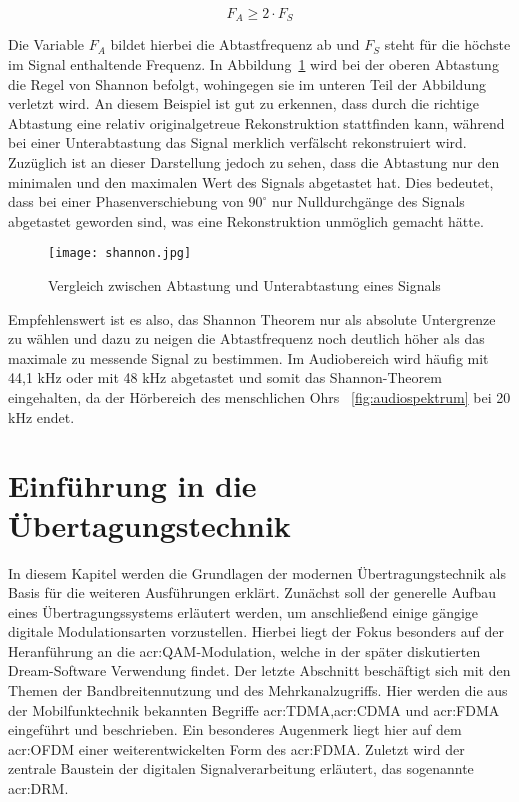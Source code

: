 \begin{equation}
	\label{equ:abtast}
	F_{A} \geq 2 \cdot F_{S}
\end{equation}

Die Variable $F_{A}$ bildet hierbei die Abtastfrequenz ab und $F_{S}$ steht für die höchste im Signal enthaltende Frequenz. In Abbildung~\ref{fig:shannon} wird bei der oberen Abtastung die Regel von Shannon befolgt, wohingegen sie im unteren Teil der Abbildung verletzt wird. An diesem Beispiel ist gut zu erkennen, dass durch die richtige Abtastung eine relativ originalgetreue Rekonstruktion stattfinden kann, während bei einer Unterabtastung das Signal merklich verfälscht rekonstruiert wird. Zuzüglich ist an dieser Darstellung jedoch zu sehen, dass die Abtastung nur den minimalen und den maximalen Wert des Signals abgetastet hat. Dies bedeutet, dass bei einer Phasenverschiebung von $90^\circ$ nur Nulldurchgänge des Signals abgetastet geworden sind, was eine Rekonstruktion unmöglich gemacht hätte. 

\begin{figure}[H]
	\centering
	\texttt{[image: shannon.jpg]}
	\caption[Vergleich zwischen Abtastung und Unterabtastung eines Signals]{Vergleich zwischen Abtastung und Unterabtastung eines Signals} \cite{stotzaudio}
	\label{fig:shannon}
\end{figure}

Empfehlenswert ist es also, das Shannon Theorem nur als absolute Untergrenze zu wählen und dazu zu neigen die Abtastfrequenz noch deutlich höher als das maximale zu messende Signal zu bestimmen.\cite{stotzaudio} Im Audiobereich wird häufig mit 44,1 kHz oder mit 48 kHz abgetastet und somit das Shannon-Theorem eingehalten, da der Hörbereich des menschlichen Ohrs ~\ref{fig:audiospektrum} bei 20 kHz endet. \cite{masteraudio}


\section{Einführung in die Übertagungstechnik}
\label{subsec:uebertragung}
In diesem Kapitel werden die Grundlagen der modernen Übertragungstechnik als Basis für die weiteren Ausführungen erklärt. Zunächst soll der generelle Aufbau eines Übertragungssystems erläutert werden, um anschließend einige gängige digitale Modulationsarten vorzustellen. Hierbei liegt der Fokus besonders auf der Heranführung an die \gls{acr:QAM}-Modulation, welche in der später diskutierten Dream-Software Verwendung findet. Der letzte Abschnitt beschäftigt sich mit den Themen der Bandbreitennutzung und des Mehrkanalzugriffs. Hier werden die aus der Mobilfunktechnik bekannten Begriffe \gls{acr:TDMA},\gls{acr:CDMA} und \gls{acr:FDMA} eingeführt und beschrieben. Ein besonderes Augenmerk liegt hier auf dem \gls{acr:OFDM} einer weiterentwickelten Form des \gls{acr:FDMA}. Zuletzt wird der zentrale Baustein der digitalen Signalverarbeitung erläutert, das sogenannte \gls{acr:DRM}.

